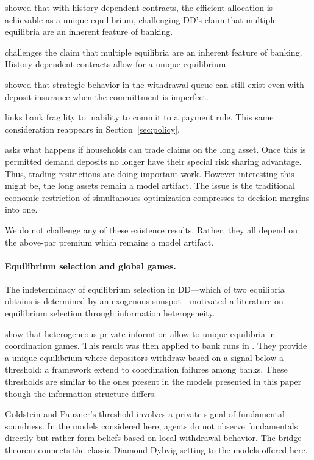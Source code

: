 \documentclass[12pt]{article}\usepackage[]{graphicx}\usepackage[]{xcolor}
\begin{document}
\citet{green2000diamond} showed that with history-dependent contracts, the efficient allocation is achievable as a unique 
equilibrium, challenging DD's claim that multiple equilibria are an inherent feature of banking.


\citet{green2000diamond}  challenges the claim that multiple equilibria are an inherent feature of banking. History dependent
contracts allow for a unique equilibrium.


\citet{peck2003equilibrium} showed that strategic behavior in the withdrawal queue can still exist even with deposit insurance
when the committment is imperfect.

\citet{ennis2010fundamental} links bank fragility to inability to commit to a payment rule. This same consideration reappears
in Section~\ref{sec:policy}.


\citet{jacklin1987demand} asks what happens if households can trade claims on the long asset. Once this is permitted
demand deposits no longer have their special risk sharing advantage. Thus, trading restrictions are doing important work. 
However interesting this might be, the long assets remain a model artifact. The issue is the traditional
economic restriction of simultanoues optimization compresses to decision margins into one. 

We do not challenge any of these existence results. Rather, they all depend on the above-par premium which remains a model
artifact.


\paragraph{Equilibrium selection and global games.}

The indeterminacy of equilibrium selection in DD---which of two equilibria obtains is determined by an exogenous 
sunspot---motivated a literature on equilibrium selection through information heterogeneity.

\citet{morris1998unique} show that heterogeneous private informtion allow to unique equilibria in coordination games. 
This result was then applied to bank runs in \citet{goldstein2005demand}. They provide a unique equilibrium where depositors
withdraw based on a signal below a threshold; a framework \citet{rochet2004coordination} extend to coordination failures
among banks. These thresholds are similar to the ones present in the models presented in this paper though the information structure differs.

Goldstein and Pauzner's threshold involves a private signal of fundamental soundness. In the models considered here, 
agents do not observe fundamentals directly but rather form beliefs based on local withdrawal behavior. The bridge theorem
connects the classic Diamond-Dybvig setting to the models offered here.
\end{document}
